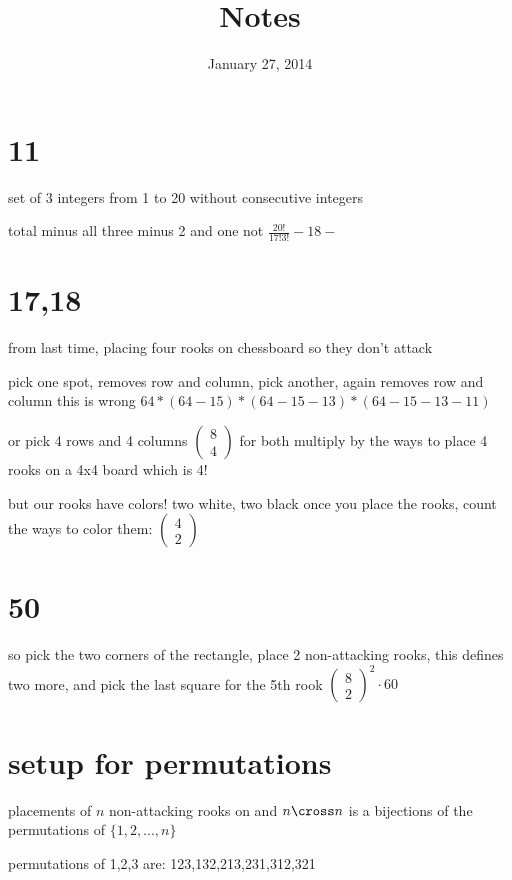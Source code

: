 \documentclass{article}
\begin{document}
\title{Notes}
\date{January 27, 2014}
\maketitle
\section*{11}
set of 3 integers from 1 to 20 without consecutive integers

total minus all three minus 2 and one not
$\frac{20!}{17!3!}-18-$
\section*{17,18}
from last time, placing four rooks on chessboard so they don't attack

pick one spot, removes row and column, pick another, again removes row and column this is wrong $64*(64-15)*(64-15-13)*(64-15-13-11)$

or pick 4 rows and 4 columns $\left(\begin{array}{c}8\\4\end{array}\right)$ for both
multiply by the ways to place 4 rooks on a 4x4 board which is 4!

but our rooks have colors! two white, two black
once you place the rooks, count the ways to color them: $\left(\begin{array}{c}4\\2\end{array}\right)$

\section*{50}
so pick the two corners of the rectangle, place 2 non-attacking rooks, this defines two more, and pick the last square for the 5th rook
$\left(\begin{array}{c}8\\2\end{array}\right)^2\cdot60$

\section*{setup for permutations}
placements of $n$ non-attacking rooks on and $n\cross n$  is a bijections of the permutations of $\{1,2,...,n\}$

permutations of 1,2,3 are:
123,132,213,231,312,321
\end{document}
